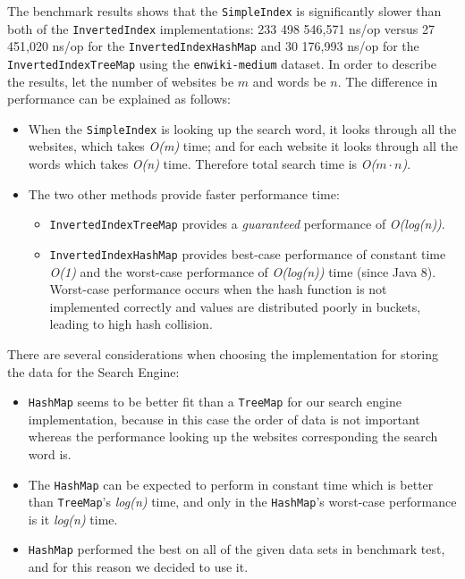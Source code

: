 The benchmark results shows that the {\tt SimpleIndex} is significantly slower than both of the {\tt InvertedIndex} implementations: 233 498 546,571 ns/op versus 27 451,020 ns/op for the {\tt InvertedIndexHashMap} and 30 176,993 ns/op for the {\tt InvertedIndexTreeMap} using the {\tt enwiki-medium} dataset. In order to describe the results, let the number of websites be $m$ and words be $n$. The difference in performance can be explained as follows:
\begin{itemize}
    \item When the {\tt SimpleIndex} is looking up the search word, it looks through all the websites, which takes \textit{O(m)} time; and for each website it looks through all the words which takes \textit{O(n)} time. Therefore total search time is \textit{O($m\cdot n$)}.
    \item The two other methods provide faster performance time:
    \begin{itemize}
        \item {\tt InvertedIndexTreeMap} provides a \textit{guaranteed} performance of \textit{O(log(n))}.
        \item {\tt InvertedIndexHashMap} provides best-case performance of constant time \textit{O(1)} and the worst-case performance of \textit{O(log(n))} time (since Java 8). Worst-case performance occurs when the hash function is not implemented correctly and values are distributed poorly in buckets, leading to high hash collision.\\
    \end{itemize}
\end{itemize}
There are several considerations when choosing the implementation for storing the data for the Search Engine:
\begin{itemize}
    \item {\tt HashMap} seems to be better fit than a {\tt TreeMap} for our search engine implementation, because in this case the order of data is not important whereas the performance looking up the websites corresponding the search word is.
    \item The {\tt HashMap} can be expected to perform in constant time which is better than {\tt TreeMap}'s \textit{log(n)} time, and only in the {\tt HashMap}'s worst-case performance is it \textit{log(n)} time.
    \item {\tt HashMap} performed the best on all of the given data sets in benchmark test, and for this reason we decided to use it.
\end{itemize}

